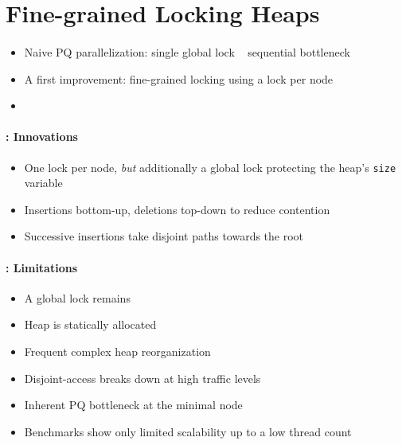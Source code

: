 \documentclass[usenames,dvipsnames]{beamer}
\begin{document}
\section{Fine-grained Locking Heaps} \label{sec:locking}


\begin{frame}{}
\framesubtitle{\citeauthor{hunt1996efficient}}

\begin{itemize}
\item Naive \ac{PQ} parallelization: single global lock \textrightarrow ~ sequential bottleneck
\item A first improvement: fine-grained locking using a lock per node
\item {}
\end{itemize}
\end{frame}

\begin{frame}{}
\framesubtitle{\citeauthor{hunt1996efficient}: Innovations}

\begin{itemize}
\item One lock per node, \emph{but} additionally a global lock protecting the heap's
      \lstinline|size| variable
\item Insertions bottom-up, deletions top-down to reduce contention
\item Successive insertions take disjoint paths towards the root
\end{itemize}
\end{frame}

\begin{frame}{}
\framesubtitle{\citeauthor{hunt1996efficient}: Limitations}

\begin{itemize}
\item A global lock remains
\item Heap is statically allocated
\item Frequent complex heap reorganization
\item Disjoint-access breaks down at high traffic levels
\item Inherent \ac{PQ} bottleneck at the minimal node
\item Benchmarks show only limited scalability up to a low thread count
\end{itemize}
\end{frame}
\end{document}

